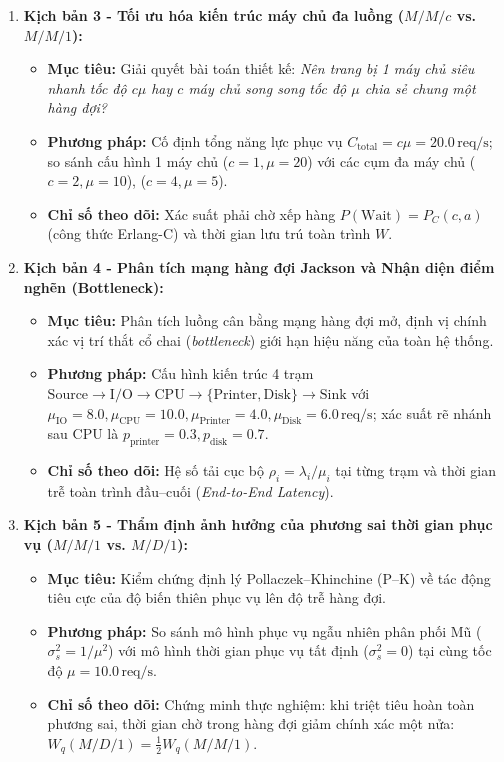\begin{enumerate}[leftmargin=1.5em, itemsep=6pt]
    \item \textbf{Kịch bản 3 - Tối ưu hóa kiến trúc máy chủ đa luồng ($M/M/c$ vs. $M/M/1$):}
    \begin{itemize}[leftmargin=1.2em, itemsep=2pt, topsep=2pt]
        \item \textbf{Mục tiêu:} Giải quyết bài toán thiết kế: \textit{Nên trang bị 1 máy chủ siêu nhanh tốc độ $c\mu$ hay $c$ máy chủ song song tốc độ $\mu$ chia sẻ chung một hàng đợi?}
        \item \textbf{Phương pháp:} Cố định tổng năng lực phục vụ $C_{\text{total}} = c\mu = 20.0\,\text{req/s}$; so sánh cấu hình 1 máy chủ ($c=1, \mu=20$) với các cụm đa máy chủ ($c=2, \mu=10$), ($c=4, \mu=5$).
        \item \textbf{Chỉ số theo dõi:} Xác suất phải chờ xếp hàng $P(\text{Wait}) = P_C(c, a)$ (công thức Erlang-C) và thời gian lưu trú toàn trình $W$.
    \end{itemize}

    \item \textbf{Kịch bản 4 - Phân tích mạng hàng đợi Jackson và Nhận diện điểm nghẽn (Bottleneck):}
    \begin{itemize}[leftmargin=1.2em, itemsep=2pt, topsep=2pt]
        \item \textbf{Mục tiêu:} Phân tích luồng cân bằng mạng hàng đợi mở, định vị chính xác vị trí thắt cổ chai (\textit{bottleneck}) giới hạn hiệu năng của toàn hệ thống.
        \item \textbf{Phương pháp:} Cấu hình kiến trúc 4 trạm $\text{Source} \to \text{I/O} \to \text{CPU} \to \{\text{Printer}, \text{Disk}\} \to \text{Sink}$ với $\mu_{\text{IO}} = 8.0, \mu_{\text{CPU}} = 10.0, \mu_{\text{Printer}} = 4.0, \mu_{\text{Disk}} = 6.0\,\text{req/s}$; xác suất rẽ nhánh sau CPU là $p_{\text{printer}} = 0.3, p_{\text{disk}} = 0.7$.
        \item \textbf{Chỉ số theo dõi:} Hệ số tải cục bộ $\rho_i = \lambda_i / \mu_i$ tại từng trạm và thời gian trễ toàn trình đầu--cuối (\textit{End-to-End Latency}).
    \end{itemize}

    \item \textbf{Kịch bản 5 - Thẩm định ảnh hưởng của phương sai thời gian phục vụ ($M/M/1$ vs. $M/D/1$):}
    \begin{itemize}[leftmargin=1.2em, itemsep=2pt, topsep=2pt]
        \item \textbf{Mục tiêu:} Kiểm chứng định lý Pollaczek--Khinchine (P--K) về tác động tiêu cực của độ biến thiên phục vụ lên độ trễ hàng đợi.
        \item \textbf{Phương pháp:} So sánh mô hình phục vụ ngẫu nhiên phân phối Mũ ($\sigma_s^2 = 1/\mu^2$) với mô hình thời gian phục vụ tất định ($\sigma_s^2 = 0$) tại cùng tốc độ $\mu = 10.0\,\text{req/s}$.
        \item \textbf{Chỉ số theo dõi:} Chứng minh thực nghiệm: khi triệt tiêu hoàn toàn phương sai, thời gian chờ trong hàng đợi giảm chính xác một nửa: $W_q(M/D/1) = \frac{1}{2} W_q(M/M/1)$.
    \end{itemize}
\end{enumerate}


